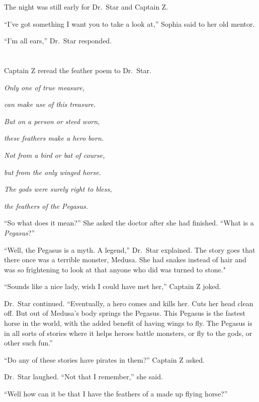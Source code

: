 \documentclass[12pt]{extbook}
\begin{document}
  The night was still early for Dr.~Star and Captain Z.
  
  \enquote{I've got something I want you to take a look at,} Sophia said
  to her old mentor.
  
  \enquote{I'm all ears,} Dr.~Star responded.
  
  \section{}\label{section-27}
  
  Captain Z reread the feather poem to Dr.~Star.
  
  \emph{Only one of true measure,}
  
  \emph{can make use of this treasure.}
  
  \emph{But on a person or steed worn,}
  
  \emph{these feathers make a hero born.}
  
  \emph{Not from a bird or bat of course,}
  
  \emph{but from the only winged horse.}
  
  \emph{The gods were surely right to bless,}
  
  \emph{the feathers of the Pegasus.}
  
  \enquote{So what does it mean?} She asked the doctor after she had
  finished. \enquote{What is a \emph{Pegasus}?}
  
  \enquote{Well, the Pegasus is a myth. A legend,} Dr.~Star explained. The
  story goes that there once was a terrible monster, Medusa. She had
  snakes instead of hair and was so frightening to look at that anyone who
  did was turned to stone."
  
  \enquote{Sounds like a nice lady, wish I could have met her,} Captain Z
  joked.
  
  Dr.~Star continued. \enquote{Eventually, a hero comes and kills her.
  Cuts her head clean off. But out of Medusa's body springs the Pegasus.
  This Pegasus is the fastest horse in the world, with the added benefit
  of having wings to fly. The Pegasus is in all sorts of stories where it
  helps heroes battle monsters, or fly to the gods, or other such fun.}
  
  \enquote{Do any of these stories have pirates in them?} Captain Z asked.
  
  Dr.~Star laughed. \enquote{Not that I remember,} she said.
  
  \enquote{Well how can it be that I have the feathers of a made up flying
  horse?}
  
\end{document}
